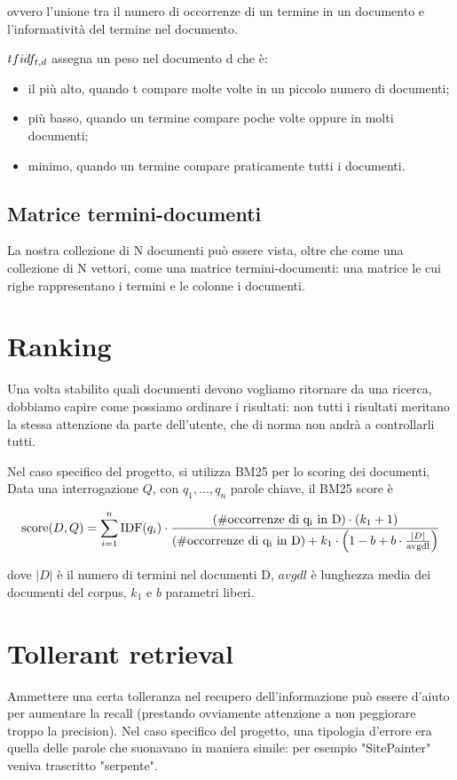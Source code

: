 ovvero l'unione tra il numero di occorrenze di un termine in un documento e l'informatività del termine nel documento.

$tf\-idf_{t,d}$ assegna un peso nel documento d che è:
\begin{itemize}
    \item il più alto, quando t compare molte volte in un piccolo numero di documenti;
    \item più basso, quando un termine compare poche volte oppure in molti documenti;
    \item minimo, quando un termine compare praticamente tutti i documenti.
\end{itemize}

\subsection{Matrice termini-documenti}
\label{subsec:termDocumentMatrix}
La nostra collezione di N documenti può essere vista, oltre che come una collezione di N vettori, come una matrice termini-documenti: una matrice le cui righe rappresentano i termini e le colonne i documenti.


\section{Ranking}
\label{sec:ranking}
Una volta stabilito quali documenti devono vogliamo ritornare da una ricerca, dobbiamo capire come possiamo ordinare i risultati: non tutti i risultati meritano la stessa attenzione da parte dell'utente, che di norma non andrà a controllarli tutti.

Nel caso specifico del progetto, si utilizza BM25 per lo scoring dei documenti,
Data una interrogazione $Q$, con $q_1, \dots , q_n$ parole chiave, il BM25 score è 

\begin{equation}
    \text{score}(D,Q) = \sum_{i=1}^{n} \text{IDF}(q_i) \cdot \frac{\text{(\#occorrenze di q\textsubscript{i} in D)} \cdot (k_1 + 1)}{\text{(\#occorrenze di q\textsubscript{i} in D)} + k_1 \cdot \left(1 - b + b \cdot \frac{|D|}{\text{avgdl}}\right)}
\end{equation}

dove $|D|$ è il numero di termini nel documenti D, $avgdl$ è lunghezza media dei documenti del \gls{corpus}, $k_1$ e $b$ parametri liberi.

\section{Tollerant retrieval}
Ammettere una certa tolleranza nel recupero dell’informazione può essere d’aiuto per aumentare la recall (prestando ovviamente attenzione a non peggiorare troppo la precision). Nel caso specifico del progetto, una tipologia d'errore era quella delle parole che suonavano in maniera simile: per esempio "SitePainter" veniva trascritto "serpente".

